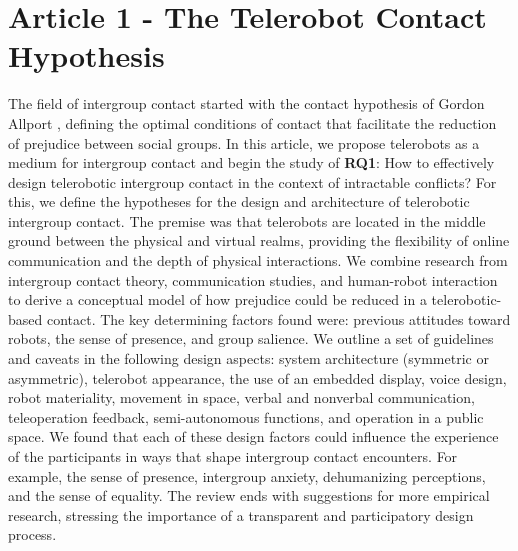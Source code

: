 \documentclass[dissertation,math,vertlayout,pdfa,colorlinks]{aaltoseries}
\begin{document}
\section{Article 1 - The Telerobot Contact Hypothesis}
The field of intergroup contact started with the contact hypothesis of Gordon Allport \cite{allportNaturePrejudice1954}, defining the optimal conditions of contact that facilitate the reduction of prejudice between social groups. In this article, we propose telerobots as a medium for intergroup contact and begin the study of \textbf{RQ1}: How to effectively design telerobotic intergroup contact in the context of intractable conflicts? For this, we define the hypotheses for the design and architecture of telerobotic intergroup contact. The premise was that telerobots are located in the middle ground between the physical and virtual realms, providing the flexibility of online communication and the depth of physical interactions. We combine research from intergroup contact theory, communication studies, and human-robot interaction to derive a conceptual model of how prejudice could be reduced in a telerobotic-based contact. The key determining factors found were: previous attitudes toward robots, the sense of presence, and group salience. We outline a set of guidelines and caveats in the following design aspects: system architecture (symmetric or asymmetric), telerobot appearance, the use of an embedded display, voice design, robot materiality, movement in space, verbal and nonverbal communication, teleoperation feedback, semi-autonomous functions, and operation in a public space. We found that each of these design factors could influence the experience of the participants in ways that shape intergroup contact encounters. For example, the sense of presence, intergroup anxiety, dehumanizing perceptions, and the sense of equality. The review ends with suggestions for more empirical research, stressing the importance of a transparent and participatory design process.
\end{document}
